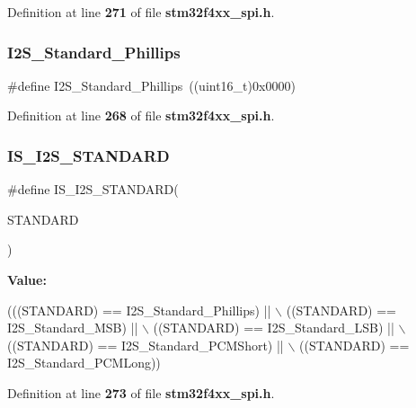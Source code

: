 Definition at line \textbf{ 271} of file \textbf{ stm32f4xx\+\_\+spi.\+h}.

\mbox{\label{group__SPI__I2S__Standard_gacdb89d66a2a941924ff4b7a8d14884f9}} 
\subsubsection{I2\+S\+\_\+\+Standard\+\_\+\+Phillips}
{\footnotesize\ttfamily \#define I2\+S\+\_\+\+Standard\+\_\+\+Phillips~((uint16\+\_\+t)0x0000)}



Definition at line \textbf{ 268} of file \textbf{ stm32f4xx\+\_\+spi.\+h}.

\mbox{\label{group__SPI__I2S__Standard_ga826b9ddb34520b8fa64c2b65c9bfd528}} 
\subsubsection{I\+S\+\_\+\+I2\+S\+\_\+\+S\+T\+A\+N\+D\+A\+RD}
{\footnotesize\ttfamily \#define I\+S\+\_\+\+I2\+S\+\_\+\+S\+T\+A\+N\+D\+A\+RD(\begin{DoxyParamCaption}\item[{}]{S\+T\+A\+N\+D\+A\+RD }\end{DoxyParamCaption})}

{\bfseries Value\+:}
\begin{DoxyCode}
(((STANDARD) == I2S_Standard_Phillips) || \(\backslash\)
                                   ((STANDARD) == I2S_Standard_MSB) || \(\backslash\)
                                   ((STANDARD) == I2S_Standard_LSB) || \(\backslash\)
                                   ((STANDARD) == I2S_Standard_PCMShort) || \(\backslash\)
                                   ((STANDARD) == I2S_Standard_PCMLong))
\end{DoxyCode}


Definition at line \textbf{ 273} of file \textbf{ stm32f4xx\+\_\+spi.\+h}.

